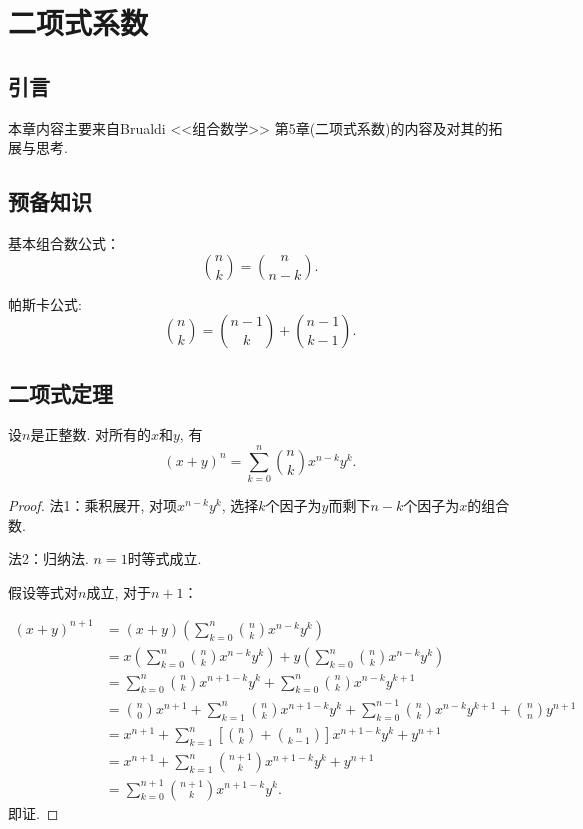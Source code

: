 \chapter{二项式系数}
\section*{引言}
本章内容主要来自Brualdi <<组合数学>> 第5章(二项式系数)的内容及对其的拓展与思考.
\section*{预备知识}
基本组合数公式：
\[\binom{n}{k} = \binom{n}{n-k}.  \]

帕斯卡公式:
\[\binom{n}{k} = \binom{n-1}{k}+\binom{n-1}{k-1}.  \]

\section{二项式定理}
\begin{theorem}[二项式定理]
    设\(n\)是正整数.  对所有的\(x\)和\(y\),  有\[(x + y)^n = \sum_{k=0}^{n} \binom{n}{k} x^{n-k} y^k.  \]
\end{theorem}
\begin{proof}
    法1：乘积展开, 对项\(x^{n-k}y^k\), 选择\(k\)个因子为\(y\)而剩下\(n-k\)个因子为\(x\)的组合数.

    法2：归纳法.  \(n=1\)时等式成立.

    假设等式对\(n\)成立, 对于\(n+1\)：

    \begin{align*}
        (x + y)^{n+1} & = (x + y) \left( \sum_{k=0}^{n} \binom{n}{k} x^{n-k} y^k \right)                                                                          \\
                      & = x \left( \sum_{k=0}^{n} \binom{n}{k} x^{n-k} y^k \right) + y \left( \sum_{k=0}^{n} \binom{n}{k} x^{n-k} y^k \right)                     \\
                      & = \sum_{k=0}^{n} \binom{n}{k} x^{n+1-k} y^k + \sum_{k=0}^{n} \binom{n}{k} x^{n-k} y^{k+1}                                                 \\
                      & = \binom{n}{0} x^{n+1} + \sum_{k=1}^{n} \binom{n}{k} x^{n+1-k} y^k + \sum_{k=0}^{n-1} \binom{n}{k} x^{n-k} y^{k+1} + \binom{n}{n} y^{n+1} \\
                      & = x^{n+1} + \sum_{k=1}^{n} \left[ \binom{n}{k} + \binom{n}{k-1} \right] x^{n+1-k} y^k + y^{n+1}                                           \\
                      & =x^{n+1} + \sum_{k=1}^{n} \binom{n+1}{k} x^{n+1-k} y^k + y^{n+1}                                                                          \\
                      & =\sum_{k=0}^{n+1} \binom{n+1}{k} x^{n+1-k} y^k.
    \end{align*}
    即证.
\end{proof}
